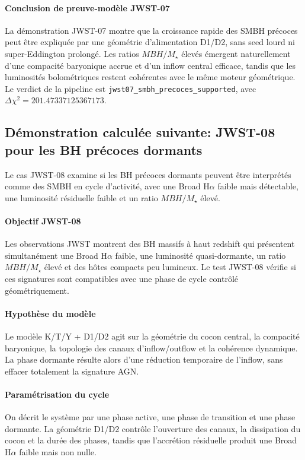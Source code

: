 \documentclass[11pt,a4paper]{article}
\begin{document}
\FloatBarrier

\paragraph{Conclusion de preuve-modèle JWST-07}
La démonstration JWST-07 montre que la croissance rapide des SMBH précoces peut être expliquée par une géométrie d'alimentation D1/D2, sans seed lourd ni super-Eddington prolongé. Les ratios $MBH/M_\star$ élevés émergent naturellement d'une compacité baryonique accrue et d'un inflow central efficace, tandis que les luminosités bolométriques restent cohérentes avec le même moteur géométrique. Le verdict de la pipeline est \texttt{jwst07\_smbh\_precoces\_supported}, avec $\Delta\chi^2=201.47337125367173$.

\subsection{Démonstration calculée suivante: JWST-08 pour les BH précoces dormants}
Le cas JWST-08 examine si les BH précoces dormants peuvent être interprétés comme des SMBH en cycle d'activité, avec une Broad H$\alpha$ faible mais détectable, une luminosité résiduelle faible et un ratio $MBH/M_\star$ élevé.

\paragraph{Objectif JWST-08}
Les observations JWST montrent des BH massifs à haut redshift qui présentent simultanément une Broad H$\alpha$ faible, une luminosité quasi-dormante, un ratio $MBH/M_\star$ élevé et des hôtes compacts peu lumineux. Le test JWST-08 vérifie si ces signatures sont compatibles avec une phase de cycle contrôlé géométriquement.

\paragraph{Hypothèse du modèle}
Le modèle K/T/Y + D1/D2 agit sur la géométrie du cocon central, la compacité baryonique, la topologie des canaux d'inflow/outflow et la cohérence dynamique. La phase dormante résulte alors d'une réduction temporaire de l'inflow, sans effacer totalement la signature AGN.

\paragraph{Paramétrisation du cycle}
On décrit le système par une phase active, une phase de transition et une phase dormante. La géométrie D1/D2 contrôle l'ouverture des canaux, la dissipation du cocon et la durée des phases, tandis que l'accrétion résiduelle produit une Broad H$\alpha$ faible mais non nulle.
\end{document}
